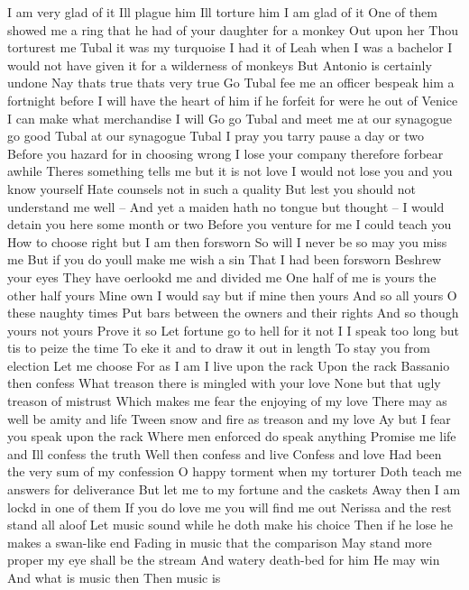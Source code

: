 I am very glad of it Ill plague him Ill torture 
him I am glad of it 
One of them showed me a ring that he had of your 
daughter for a monkey 
Out upon her Thou torturest me Tubal it was my 
turquoise I had it of Leah when I was a bachelor 
I would not have given it for a wilderness of monkeys 
But Antonio is certainly undone 
Nay thats true thats very true Go Tubal fee 
me an officer bespeak him a fortnight before I 
will have the heart of him if he forfeit for were 
he out of Venice I can make what merchandise I 
will Go go Tubal and meet me at our synagogue 
go good Tubal at our synagogue Tubal 
I pray you tarry pause a day or two 
Before you hazard for in choosing wrong 
I lose your company therefore forbear awhile 
Theres something tells me but it is not love 
I would not lose you and you know yourself 
Hate counsels not in such a quality 
But lest you should not understand me well -- 
And yet a maiden hath no tongue but thought -- 
I would detain you here some month or two 
Before you venture for me I could teach you 
How to choose right but I am then forsworn 
So will I never be so may you miss me 
But if you do youll make me wish a sin 
That I had been forsworn Beshrew your eyes 
They have oerlookd me and divided me 
One half of me is yours the other half yours 
Mine own I would say but if mine then yours 
And so all yours O these naughty times 
Put bars between the owners and their rights 
And so though yours not yours Prove it so 
Let fortune go to hell for it not I 
I speak too long but tis to peize the time 
To eke it and to draw it out in length 
To stay you from election 
Let me choose 
For as I am I live upon the rack 
Upon the rack Bassanio then confess 
What treason there is mingled with your love 
None but that ugly treason of mistrust 
Which makes me fear the enjoying of my love 
There may as well be amity and life 
Tween snow and fire as treason and my love 
Ay but I fear you speak upon the rack 
Where men enforced do speak anything 
Promise me life and Ill confess the truth 
Well then confess and live 
Confess and love 
Had been the very sum of my confession 
O happy torment when my torturer 
Doth teach me answers for deliverance 
But let me to my fortune and the caskets 
Away then I am lockd in one of them 
If you do love me you will find me out 
Nerissa and the rest stand all aloof 
Let music sound while he doth make his choice 
Then if he lose he makes a swan-like end 
Fading in music that the comparison 
May stand more proper my eye shall be the stream 
And watery death-bed for him He may win 
And what is music then Then music is 
